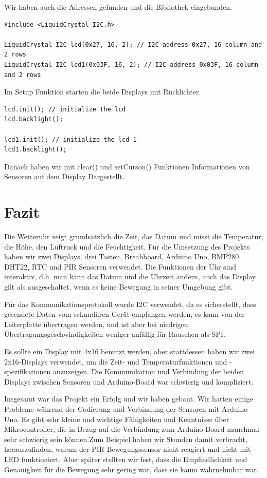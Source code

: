 \documentclass[conference]{IEEEtran}
\begin{document}
Wir haben auch die Adressen gefunden und die Bibliothek eingebunden.
\begin{lstlisting}[style=CStyle]
#include <LiquidCrystal_I2C.h>

LiquidCrystal_I2C lcd(0x27, 16, 2); // I2C address 0x27, 16 column and 2 rows
LiquidCrystal_I2C lcd1(0x03F, 16, 2); // I2C address 0x03F, 16 column and 2 rows
\end{lstlisting}\textbf{}

Im Setup Funktion starten die beide Displays mit Rücklichter.

\begin{lstlisting}[style=CStyle]
lcd.init(); // initialize the lcd
lcd.backlight();

lcd1.init(); // initialize the lcd 1
lcd1.backlight();
\end{lstlisting}\textbf{}

Danach haben wir mit clear() und setCurson() Funktionen Informationen von Sensoren auf dem Display Dargestellt.

\section{Fazit}

Die Wetteruhr zeigt  grundsätzlich die Zeit, das Datum und misst die Temperatur, die Höhe, den Luftruck und die Feuchtigkeit. Für die Umsetzung des Projekts haben wir zwei Displays, drei Tasten, Breabboard, Arduino Uno, BMP280, DHT22, RTC und PIR Sensoren verwendet. Die Funktionen der Uhr sind interaktiv, d.h. man kann das Datum und die Uhrzeit ändern, auch das Display gilt als ausgeschaltet, wenn es keine Bewegung in seiner Umgebung gibt.

Für das Kommunikationsprotokoll wurde I2C verwendet, da es sicherstellt, dass gesendete Daten vom sekundären Gerät empfangen werden, es kann von der Leiterplatte übertragen werden, und ist aber bei niedrigen Übertragungsgeschwindigkeiten weniger anfällig für Rauschen als SPI.



Es sollte ein Display mit 4x16 benutzt werden, aber stattdessen haben wir zwei 2x16-Displays verwendet, um die Zeit- und Temperaturfunktionen und -spezifikationen anzuzeigen. Die Kommunikation und Verbindung der beiden Displays zwischen Sensoren und Arduino-Board war schwierig und kompliziert.

Insgesamt war das Projekt ein Erfolg und wir haben gebaut. Wir hatten einige Probleme während der Codierung und Verbindung der Sensoren mit Arduino Uno. Es gibt sehr kleine und wichtige Fähigkeiten und Kenntnisse über Mikrocontroller, die in Bezug auf die Verbindung zum Arduino Board manchmal sehr schwierig sein können.Zum Beispiel haben wir Stunden damit verbracht, herauszufinden, warum der PIR-Bewegungssensor nicht reagiert und nicht mit LED funktioniert. Aber später stellten wir fest, dass die Empfindlichkeit und Genauigkeit für die Bewegung sehr gering war, dass sie kaum wahrnehmbar war.
\end{document}

